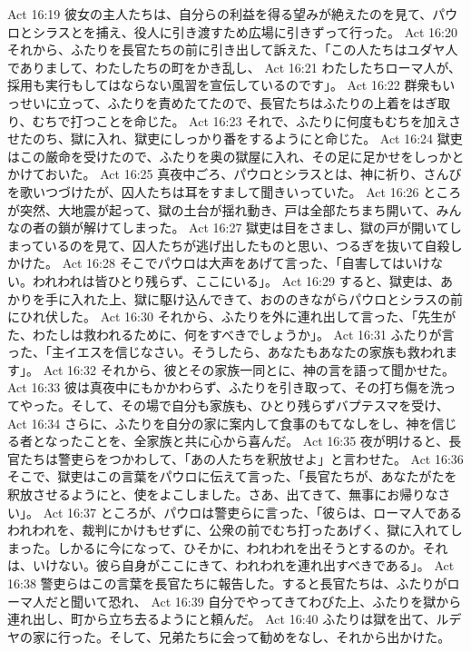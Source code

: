 Act 16:19  彼女の主人たちは、自分らの利益を得る望みが絶えたのを見て、パウロとシラスとを捕え、役人に引き渡すため広場に引きずって行った。
Act 16:20  それから、ふたりを長官たちの前に引き出して訴えた、「この人たちはユダヤ人でありまして、わたしたちの町をかき乱し、
Act 16:21  わたしたちローマ人が、採用も実行もしてはならない風習を宣伝しているのです」。
Act 16:22  群衆もいっせいに立って、ふたりを責めたてたので、長官たちはふたりの上着をはぎ取り、むちで打つことを命じた。
Act 16:23  それで、ふたりに何度もむちを加えさせたのち、獄に入れ、獄吏にしっかり番をするようにと命じた。
Act 16:24  獄吏はこの厳命を受けたので、ふたりを奥の獄屋に入れ、その足に足かせをしっかとかけておいた。
Act 16:25  真夜中ごろ、パウロとシラスとは、神に祈り、さんびを歌いつづけたが、囚人たちは耳をすまして聞きいっていた。
Act 16:26  ところが突然、大地震が起って、獄の土台が揺れ動き、戸は全部たちまち開いて、みんなの者の鎖が解けてしまった。
Act 16:27  獄吏は目をさまし、獄の戸が開いてしまっているのを見て、囚人たちが逃げ出したものと思い、つるぎを抜いて自殺しかけた。
Act 16:28  そこでパウロは大声をあげて言った、「自害してはいけない。われわれは皆ひとり残らず、ここにいる」。
Act 16:29  すると、獄吏は、あかりを手に入れた上、獄に駆け込んできて、おののきながらパウロとシラスの前にひれ伏した。
Act 16:30  それから、ふたりを外に連れ出して言った、「先生がた、わたしは救われるために、何をすべきでしょうか」。
Act 16:31  ふたりが言った、「主イエスを信じなさい。そうしたら、あなたもあなたの家族も救われます」。
Act 16:32  それから、彼とその家族一同とに、神の言を語って聞かせた。
Act 16:33  彼は真夜中にもかかわらず、ふたりを引き取って、その打ち傷を洗ってやった。そして、その場で自分も家族も、ひとり残らずバプテスマを受け、
Act 16:34  さらに、ふたりを自分の家に案内して食事のもてなしをし、神を信じる者となったことを、全家族と共に心から喜んだ。
Act 16:35  夜が明けると、長官たちは警吏らをつかわして、「あの人たちを釈放せよ」と言わせた。
Act 16:36  そこで、獄吏はこの言葉をパウロに伝えて言った、「長官たちが、あなたがたを釈放させるようにと、使をよこしました。さあ、出てきて、無事にお帰りなさい」。
Act 16:37  ところが、パウロは警吏らに言った、「彼らは、ローマ人であるわれわれを、裁判にかけもせずに、公衆の前でむち打ったあげく、獄に入れてしまった。しかるに今になって、ひそかに、われわれを出そうとするのか。それは、いけない。彼ら自身がここにきて、われわれを連れ出すべきである」。
Act 16:38  警吏らはこの言葉を長官たちに報告した。すると長官たちは、ふたりがローマ人だと聞いて恐れ、
Act 16:39  自分でやってきてわびた上、ふたりを獄から連れ出し、町から立ち去るようにと頼んだ。
Act 16:40  ふたりは獄を出て、ルデヤの家に行った。そして、兄弟たちに会って勧めをなし、それから出かけた。
